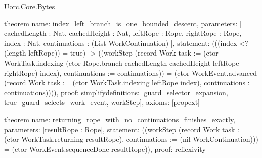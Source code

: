 \begin{lexlean}{Uorc.Core.Bytes}
\begin{semanticmodule}
theorem{
  name: index_left_branch_is_one_bounded_descent,
  parameters: [
    cachedLength : Nat,
    cachedHeight : Nat,
    leftRope : Rope,
    rightRope : Rope,
    index : Nat,
    continuations : (List WorkContinuation)
  ],
  statement: (((index <? (length leftRope)) = true) -> ((workStep (record Work {task := (ctor WorkTask.indexing (ctor Rope.branch cachedLength cachedHeight leftRope rightRope) index), continuations := continuations})) = (ctor WorkEvent.advanced (record Work {task := (ctor WorkTask.indexing leftRope index), continuations := continuations})))),
  proof: simplify{definitions: [guard_selector_expansion, true_guard_selects_work_event, workStep]},
  axioms: [propext]
}

theorem{
  name: returning_rope_with_no_continuations_finishes_exactly,
  parameters: [resultRope : Rope],
  statement: ((workStep (record Work {task := (ctor WorkTask.returning resultRope), continuations := (nil WorkContinuation)})) = (ctor WorkEvent.sequenceDone resultRope)),
  proof: reflexivity{}
}
\end{semanticmodule}
\end{lexlean}

